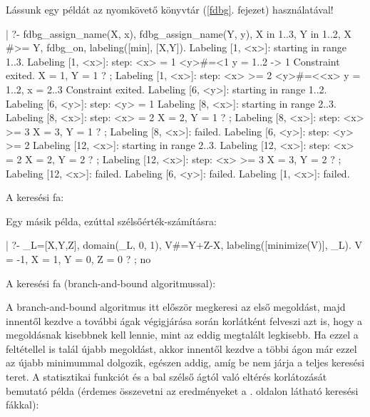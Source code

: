 Lássunk egy példát az \fdbg nyomkövető könyvtár (\ref{fdbg}. fejezet) használatával!
\br
\begin{prologcode}
| ?- fdbg_assign_name(X, x), fdbg_assign_name(Y, y),
     X in 1..3, Y in 1..2, X #>= Y, fdbg_on,
     labeling([min], [X,Y]).
Labeling [1, <x>]: starting in range 1..3.
Labeling [1, <x>]: step: <x> = 1
    <y>#=<1     y = 1..2 -> {1} Constraint exited.
                                                X = 1, Y = 1 ? ;
Labeling [1, <x>]: step: <x> >= 2
    <y>#=<<x>   y = 1..2, x = 2..3  Constraint exited.
    Labeling [6, <y>]: starting in range 1..2.
    Labeling [6, <y>]: step: <y> = 1
        Labeling [8, <x>]: starting in range 2..3.
        Labeling [8, <x>]: step: <x> = 2
                                                X = 2, Y = 1 ? ;
        Labeling [8, <x>]: step: <x> >= 3
                                                X = 3, Y = 1 ? ;
        Labeling [8, <x>]: failed.
    Labeling [6, <y>]: step: <y> >= 2
        Labeling [12, <x>]: starting in range 2..3.
        Labeling [12, <x>]: step: <x> = 2
                                                X = 2, Y = 2 ? ;
        Labeling [12, <x>]: step: <x> >= 3
                                                X = 3, Y = 2 ? ;
        Labeling [12, <x>]: failed.
    Labeling [6, <y>]: failed.
Labeling [1, <x>]: failed.
\end{prologcode}

A keresési fa:

\begin{center}
\end{center}

Egy másik példa, ezúttal szélsőérték-számításra:

\begin{prologcode}
| ?- _L=[X,Y,Z], domain(_L, 0, 1), V#=Y+Z-X, labeling([minimize(V)], _L).
V = -1, X = 1, Y = 0, Z = 0 ? ;
no
\end{prologcode}

A keresési fa (branch-and-bound algoritmussal):

\begin{center}
\end{center}

A branch-and-bound algoritmus itt először megkeresi az első megoldást, majd innentől
kezdve a további ágak végigjárása során korlátként felveszi azt is, hogy a megoldásnak
kisebbnek kell lennie, mint az eddig megtalált legkisebb. Ha ezzel a feltétellel is
talál újabb megoldást, akkor innentől kezdve a többi ágon már ezzel az újabb minimummal
dolgozik, egészen addig, amíg be nem járja a teljes keresési teret.
\br
A statisztikai funkciót  és a bal szélső ágtól való eltérés korlátozását bemutató példa
(érdemes összevetni az eredményeket a \pageref{kerfak}. oldalon látható keresési
fákkal):

